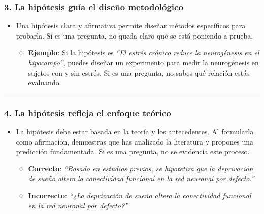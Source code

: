 \documentclass[
  10pt]{article}
\providecommand{\tightlist}{%
  \setlength{\itemsep}{0pt}\setlength{\parskip}{0pt}}\usepackage{longtable,booktabs,array}
\begin{document}
\begin{tcolorbox}
\subsubsection{\texorpdfstring{\textbf{3. La hipótesis guía el diseño
metodológico}}{3. La hipótesis guía el diseño metodológico}}\label{la-hipuxf3tesis-guuxeda-el-diseuxf1o-metodoluxf3gico}

\begin{itemize}
\tightlist
\item
  Una hipótesis clara y afirmativa permite diseñar métodos específicos
  para probarla. Si es una pregunta, no queda claro qué se está poniendo
  a prueba.

  \begin{itemize}
  \tightlist
  \item
    \textbf{Ejemplo}: Si la hipótesis es \emph{``El estrés crónico
    reduce la neurogénesis en el hipocampo''}, puedes diseñar un
    experimento para medir la neurogénesis en sujetos con y sin estrés.
    Si es una pregunta, no sabes qué relación estás evaluando.
  \end{itemize}
\end{itemize}

\begin{center}\rule{0.5\linewidth}{0.5pt}\end{center}

\subsubsection{\texorpdfstring{\textbf{4. La hipótesis refleja el
enfoque
teórico}}{4. La hipótesis refleja el enfoque teórico}}\label{la-hipuxf3tesis-refleja-el-enfoque-teuxf3rico}

\begin{itemize}
\tightlist
\item
  La hipótesis debe estar basada en la teoría y los antecedentes. Al
  formularla como afirmación, demuestras que has analizado la literatura
  y propones una predicción fundamentada. Si es una pregunta, no se
  evidencia este proceso.

  \begin{itemize}
  \tightlist
  \item
    \textbf{Correcto}: \emph{``Basado en estudios previos, se hipotetiza
    que la deprivación de sueño altera la conectividad funcional en la
    red neuronal por defecto.''}\\
  \item
    \textbf{Incorrecto}: \emph{``¿La deprivación de sueño altera la
    conectividad funcional en la red neuronal por defecto?''}
  \end{itemize}
\end{itemize}


\end{tcolorbox}
\end{document}
